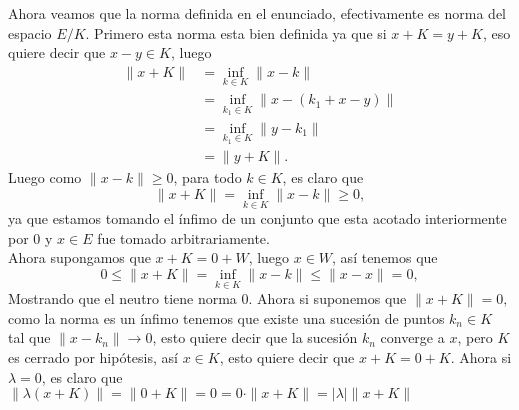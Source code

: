 \begin{itemize}
\begin{itemize}
\begin{sproof}
            Ahora veamos que la norma definida en el enunciado, efectivamente es norma del espacio $E/K.$ Primero esta norma esta bien definida ya que si $x+K=y+K$, eso quiere decir que $x-y\in K$, luego
            \begin{align*}
                 \|x+K\|&=\inf_{k\in K}\|x-k\|\\
                 &=\inf_{k_1\in K}\|x-(k_1+x-y)\|\\
                 &=\inf_{k_1\in K}\|y-k_1\|\\
                 &=\|y+K\|.
             \end{align*}
             Luego como $\|x-k\|\geq 0$, para todo $k\in K$, es claro que 
            $$\|x+K\|=\inf_{k\in K}\|x-k\|\geq 0,$$
            ya que estamos tomando el ínfimo de un conjunto que esta acotado interiormente por $0$ y $x\in E$ fue tomado arbitrariamente.\\

            Ahora supongamos que $x+K=0+W$, luego $x\in W$, así tenemos que 
            $$0\leq \|x+K\|=\inf_{k\in K}\|x-k\|\leq \|x-x\|=0,$$
            Mostrando que el neutro tiene norma $0.$ Ahora si suponemos que $\|x+K\|=0,$ como la norma es un ínfimo tenemos que existe una sucesión de puntos $k_n\in K$ tal que $\|x-k_n\|\to 0$, esto quiere decir que la sucesión $k_n$ converge a $x$, pero $K$ es cerrado por hipótesis, así $x\in K$, esto quiere decir que $x+K=0+K$. Ahora si $\lambda=0$, es claro que $\|\lambda(x+K)\|=\|0+K\|=0=0\cdot\|x+K\|=|\lambda|\|x+K\|$


\end{sproof}
\end{itemize}
\end{itemize}
